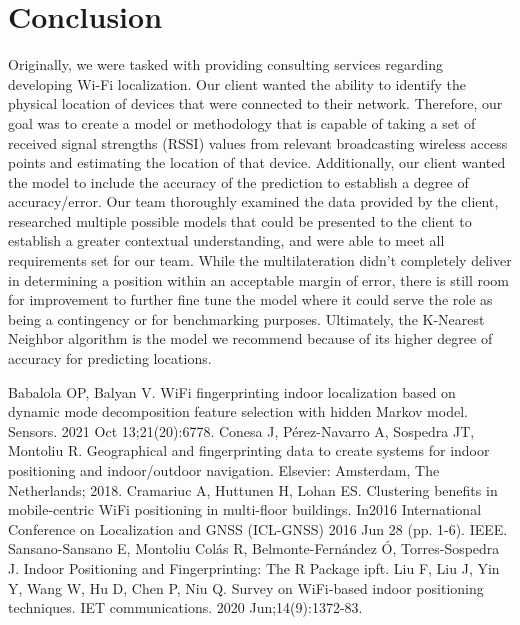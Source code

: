 \documentclass[12pt, conference]{IEEEtran}
\begin{document}
\section{Conclusion}
Originally, we were tasked with providing consulting services regarding developing Wi-Fi localization. Our client wanted the ability to identify the physical location of devices that were connected to their network. Therefore, our goal was to create a model or methodology that is capable of taking a set of received signal strengths (RSSI) values from relevant broadcasting wireless access points and estimating the location of that device. Additionally, our client wanted the model to include the accuracy of the prediction to establish a degree of accuracy/error. Our team thoroughly examined the data provided by the client, researched multiple possible models that could be presented to the client to establish a greater contextual understanding, and were able to meet all requirements set for our team. While the multilateration didn't completely deliver in determining a position within an acceptable margin of error, there is still room for improvement to further fine tune the model where it could serve the role as being a contingency or for benchmarking purposes. Ultimately, the K-Nearest Neighbor algorithm is the model we recommend because of its higher degree of accuracy for predicting locations.


\begin{thebibliography}{00}
 Babalola OP, Balyan V. WiFi fingerprinting indoor localization based on dynamic mode decomposition feature selection with hidden Markov model. Sensors. 2021 Oct 13;21(20):6778.
\newline
{} Conesa J, Pérez-Navarro A, Sospedra JT, Montoliu R. Geographical and fingerprinting data to create systems for indoor positioning and indoor/outdoor navigation. Elsevier: Amsterdam, The Netherlands; 2018.
\newline
{} Cramariuc A, Huttunen H, Lohan ES. Clustering benefits in mobile-centric WiFi positioning in multi-floor buildings. In2016 International Conference on Localization and GNSS (ICL-GNSS) 2016 Jun 28 (pp. 1-6). IEEE.
\newline
{} Sansano-Sansano E, Montoliu Colás R, Belmonte-Fernández Ó, Torres-Sospedra J. Indoor Positioning and Fingerprinting: The R Package ipft.
\newline
{} Liu F, Liu J, Yin Y, Wang W, Hu D, Chen P, Niu Q. Survey on WiFi‐based indoor positioning techniques. IET communications. 2020 Jun;14(9):1372-83.
\end{thebibliography}
\vspace{12pt}
\end{document}
